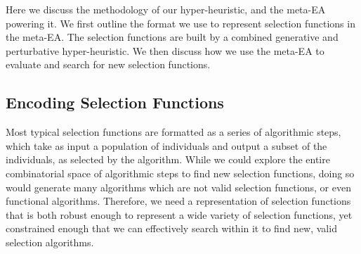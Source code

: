 \documentclass[sigconf]{acmart}
\begin{document}
Here we discuss the methodology of our hyper-heuristic, and the meta-EA powering it. We first outline the format we use to represent selection functions in the meta-EA. The selection functions are built by a combined generative and perturbative hyper-heuristic. We then discuss how we use the meta-EA to evaluate and search for new selection functions. 

\subsection{Encoding Selection Functions}
\label{Methodology-Encoding Selection Functions}

Most typical selection functions are formatted as a series of algorithmic steps, which take as input a population of individuals and output a subset of the individuals, as selected by the algorithm. While we could explore the entire combinatorial space of algorithmic steps to find new selection functions, doing so would generate many algorithms which are not valid selection functions, or even functional algorithms. Therefore, we need a representation of selection functions that is both robust enough to represent a wide variety of selection functions, yet constrained enough that we can effectively search within it to find new, valid selection algorithms.
\end{document}
